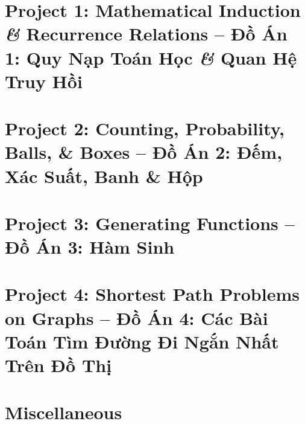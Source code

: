 \documentclass{article}
\begin{document}

\section{Project 1: Mathematical Induction {\it\&} Recurrence Relations -- Đồ Án 1: Quy Nạp Toán Học {\it\&} Quan Hệ Truy Hồi}


\section{Project 2: Counting, Probability, Balls, \& Boxes -- Đồ Án 2: Đếm, Xác Suất, Banh \& Hộp}


\section{Project 3: Generating Functions -- Đồ Án 3: Hàm Sinh}


\section{Project 4: Shortest Path Problems on Graphs -- Đồ Án 4: Các Bài Toán Tìm Đường Đi Ngắn Nhất Trên Đồ Thị}


\section{Miscellaneous}


\printbibliography[heading=bibintoc]
    
\end{document}
